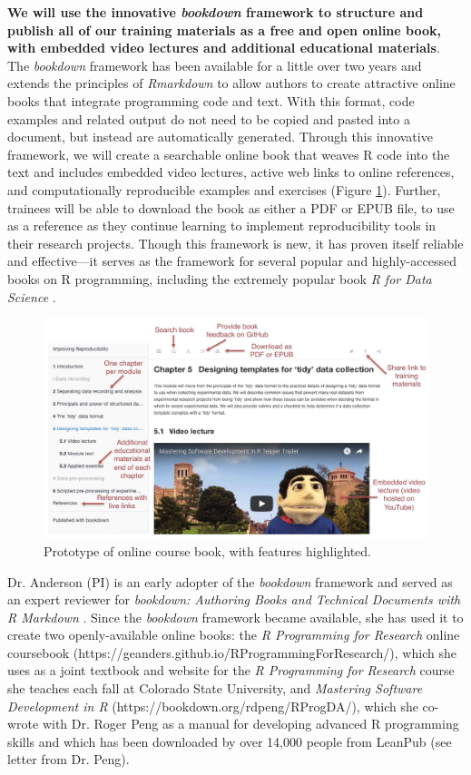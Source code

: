 \documentclass[pdftex,english,11pt,parskip=half]{scrartcl}
\begin{document}
\textbf{We will use the
innovative \textit{bookdown} framework \cite{xie2016bookdown} to structure and
publish all of our training materials as a free and open online book, with embedded video lectures and additional educational materials}. The
\textit{bookdown} framework has been available for a little over two years and
extends the principles of \textit{Rmarkdown} \cite{xie2015dynamic} to allow authors to create attractive
online books that integrate programming code and text. With this format, code examples and related
output do not need to be copied and pasted into a document, but instead are
automatically generated. Through this innovative framework, we
will create a searchable online book that weaves R code into the text
and includes embedded video lectures, active web links to online
references, and computationally reproducible examples and exercises
(Figure \ref{fig:prototype}). Further, trainees will be able to
download the book as either a PDF or EPUB file, to use as a reference as they
continue learning to implement reproducibility tools in their research projects. Though this framework is new, it has proven
itself reliable and effective---it serves as the framework for several 
popular and highly-accessed books on R programming, including the extremely popular book \textit{R for Data
Science} \cite{wickham2016r}. 

\begin{figure}[t] \includegraphics[width =
\textwidth]{figures/book_prototype.jpg} \caption{Prototype of online course
book, with features highlighted.} \label{fig:prototype} \end{figure}

Dr. Anderson (PI) is an early adopter of the \textit{bookdown} framework and served as an expert reviewer for \textit{bookdown: Authoring Books
and Technical Documents with R Markdown} \cite{xie2016bookdown}. Since
the \textit{bookdown} framework became available, she has used it to create two openly-available online
books: the \textit{R Programming for Research} online coursebook (https://geanders.github.io/RProgrammingForResearch/), which she uses
as a joint textbook and website for the \textit{R Programming for Research}
course she teaches each fall at Colorado State University, and \textit{Mastering
Software Development in R} (https://bookdown.org/rdpeng/RProgDA/), which she co-wrote with Dr. Roger Peng as a manual
for developing advanced R programming skills and which has been downloaded by
over 14,000 people from LeanPub (see letter from Dr. Peng). 
\end{document}
